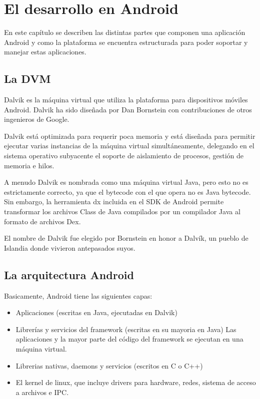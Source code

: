 \chapter{El desarrollo en Android}
\label{cpt:android.dev}

En este cap\'itulo se describen las distintas partes que componen una aplicaci\'on Android y como la plataforma se encuentra estructurada para poder soportar y manejar estas aplicaciones.

\section{La \ac{DVM}}
\label{sec:dvm}

Dalvik es la m\'aquina virtual que utiliza la plataforma para dispositivos m\'oviles Android. Dalvik ha sido diseñada por Dan Bornstein con contribuciones de otros ingenieros de Google.

Dalvik est\'a optimizada para requerir poca memoria y est\'a diseñada para permitir ejecutar varias instancias de la m\'aquina virtual simult\'aneamente, delegando en el sistema operativo subyacente el soporte de aislamiento de procesos, gesti\'on de memoria e hilos.

A menudo Dalvik es nombrada como una m\'aquina virtual Java, pero esto no es estrictamente correcto, ya que el bytecode con el que opera no es Java bytecode. Sin embargo, la herramienta dx incluida en el \ac{SDK} de Android permite transformar los archivos Class de Java compilados por un compilador Java al formato de archivos Dex.

El nombre de Dalvik fue elegido por Bornstein en honor a Dalvík, un pueblo de Islandia donde vivieron antepasados suyos.~\cite{wiki.dvm}

\section{La arquitectura Android}
\label{sec:arq}

Basicamente, Android tiene las siguientes capas:


\begin{itemize}
\item Aplicaciones (escritas en Java, ejecutadas en Dalvik)
\item Librer\'ias y servicios del framework (escritas en su mayoria en Java)
\subitem Las aplicaciones y la mayor parte del c\'odigo del framework se ejecutan en una m\'aquina virtual. 
\item Librerias nativas, daemons y servicios (escritos en C o C++)
\item El kernel de linux, que incluye
\subitem drivers para hardware, redes, sistema de acceso a archivos e \ac{IPC}.
\end{itemize}

